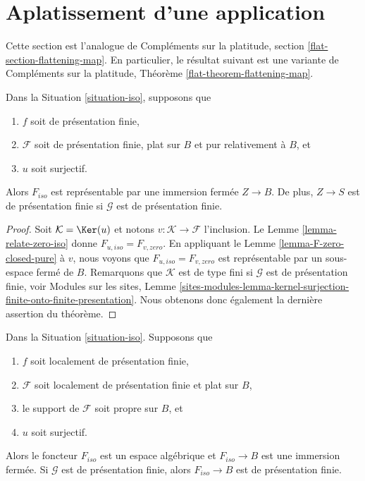 \section{Aplatissement d'une application}
\label{section-flattening-map}

\noindent
Cette section est l'analogue de
Compléments sur la platitude, section \ref{flat-section-flattening-map}.
En particulier, le résultat suivant est une variante de
Compléments sur la platitude, Théorème \ref{flat-theorem-flattening-map}.

\begin{theorem}
\label{theorem-flattening-map}
Dans la Situation \ref{situation-iso}, supposons que
\begin{enumerate}
\item $f$ soit de présentation finie,
\item $\mathcal{F}$ soit de présentation finie, plat sur $B$ et
pur relativement à $B$, et
\item $u$ soit surjectif.
\end{enumerate}
Alors $F_{iso}$ est représentable par une immersion fermée $Z \to B$.
De plus, $Z \to S$ est de présentation finie si $\mathcal{G}$ est
de présentation finie.
\end{theorem}

\begin{proof}
Soit $\mathcal{K} = \Ker(u)$ et notons $v : \mathcal{K} \to \mathcal{F}$
l'inclusion. Le Lemme \ref{lemma-relate-zero-iso} donne
$F_{u, iso} = F_{v, zero}$. En appliquant le Lemme \ref{lemma-F-zero-closed-pure}
à $v$, nous voyons que $F_{u, iso} = F_{v, zero}$ est représentable
par un sous-espace fermé de $B$. Remarquons que $\mathcal{K}$ est de type fini
si $\mathcal{G}$ est de présentation finie, voir
Modules sur les sites, Lemme
\ref{sites-modules-lemma-kernel-surjection-finite-onto-finite-presentation}.
Nous obtenons donc également la dernière assertion du théorème.
\end{proof}

\begin{lemma}
\label{lemma-F-iso-closed}
Dans la Situation \ref{situation-iso}. Supposons que
\begin{enumerate}
\item $f$ soit localement de présentation finie,
\item $\mathcal{F}$ soit localement de présentation finie et plat sur $B$,
\item le support de $\mathcal{F}$ soit propre sur $B$, et
\item $u$ soit surjectif.
\end{enumerate}
Alors le foncteur $F_{iso}$ est un espace algébrique et $F_{iso} \to B$
est une immersion fermée. Si $\mathcal{G}$ est de présentation finie, alors
$F_{iso} \to B$ est de présentation finie.
\end{lemma}

